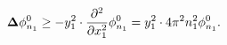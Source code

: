 \begin{equation}
{\bf \Delta} \phi_{n_{1}}^{0} \geq - y_{1}^{2} \cdot
\frac{\partial^{2}}{\partial x_{1}^{2}}\phi_{n_{1}}^{0} 
= y_{1}^{2} \cdot 4 \pi ^{2}n_{1}^{2}\phi_{n_{1}}^{0}.
\end{equation}

